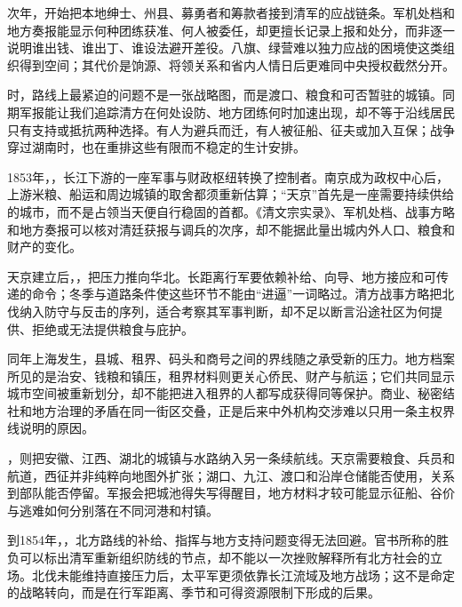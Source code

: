 次年，开始把本地绅士、州县、募勇者和筹款者接到清军的应战链条。军机处档和地方奏报能显示何种团练获准、何人被委任，却更擅长记录上报和处分，而非逐一说明谁出钱、谁出丁、谁设法避开差役。八旗、绿营难以独力应战的困境使这类组织得到空间；其代价是饷源、将领关系和省内人情日后更难同中央授权截然分开。

时，路线上最紧迫的问题不是一张战略图，而是渡口、粮食和可否暂驻的城镇。同期军报能让我们追踪清方在何处设防、地方团练何时加速出现，却不等于沿线居民只有支持或抵抗两种选择。有人为避兵而迁，有人被征船、征夫或加入互保；战争穿过湖南时，也在重排这些有限而不稳定的生计安排。

1853年，，长江下游的一座军事与财政枢纽转换了控制者。南京成为政权中心后，上游米粮、船运和周边城镇的取舍都须重新估算；“天京”首先是一座需要持续供给的城市，而不是占领当天便自行稳固的首都。《清文宗实录》、军机处档、战事方略和地方奏报可以核对清廷获报与调兵的次序，却不能据此量出城内外人口、粮食和财产的变化。

天京建立后，，把压力推向华北。长距离行军要依赖补给、向导、地方接应和可传递的命令；冬季与道路条件使这些环节不能由“进逼”一词略过。清方战事方略把北伐纳入防守与反击的序列，适合考察其军事判断，却不足以断言沿途社区为何提供、拒绝或无法提供粮食与庇护。

同年上海发生，县城、租界、码头和商号之间的界线随之承受新的压力。地方档案所见的是治安、钱粮和镇压，租界材料则更关心侨民、财产与航运；它们共同显示城市空间被重新划分，却不能把进入租界的人都写成获得同等保护。商业、秘密结社和地方治理的矛盾在同一街区交叠，正是后来中外机构交涉难以只用一条主权界线说明的原因。

，则把安徽、江西、湖北的城镇与水路纳入另一条续航线。天京需要粮食、兵员和航道，西征并非纯粹向地图外扩张；湖口、九江、渡口和沿岸仓储能否使用，关系到部队能否停留。军报会把城池得失写得醒目，地方材料才较可能显示征船、谷价与逃难如何分别落在不同河港和村镇。

到1854年，，北方路线的补给、指挥与地方支持问题变得无法回避。官书所称的胜负可以标出清军重新组织防线的节点，却不能以一次挫败解释所有北方社会的立场。北伐未能维持直接压力后，太平军更须依靠长江流域及地方战场；这不是命定的战略转向，而是在行军距离、季节和可得资源限制下形成的后果。

